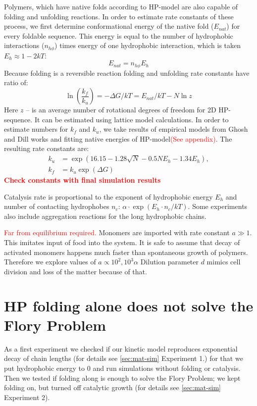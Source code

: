 \documentclass[journal=jacsat,manuscript=article,layout=twocolumn]{achemso}
\newcommand*{\ga}{\alpha}
\newcommand*{\gD}{\Delta}
\newcommand*{\pt}[1]{\left( #1\right)}
\newcommand*{\red}[1]{\textcolor{red}{#1}}
\begin{document}
Polymers, which have native folds according to HP-model are also capable of folding and unfolding 
reactions. In order to estimate rate constants of these process, we first determine conformational 
energy of the native fold ($E_{nat}$) for every foldable sequence. This energy is equal to the 
number of hydrophobic interactions ($n_{h\phi}$) times energy of one hydrophobic interaction, which 
is taken $E_h\approx 1-2kT$:
\begin{equation}
 E_{nat}=n_{h\phi}E_h
\end{equation} 
Because folding is a reversible reaction folding and unfolding rate constants have ratio 
of\cite{Ghosh2009}:
\begin{equation}
 \ln\pt{\frac{k_f}{k_u}}=-\gD G/kT = E_{nat}/kT-N\ln z
\end{equation} 
Here $z$ -- is an average number of rotational degrees of freedom for 2D HP-sequence. It can be 
estimated using lattice model calculations.
In order to estimate numbers for $k_f$ and $k_u$, we take results of empirical models from Ghosh 
and Dill works\cite{Ghosh2010,Dill2011} and fitting native energies of HP-model\red{(See 
appendix)}. The resulting rate constants are:
\begin{equation}
\begin{split}
  k_u &= \exp(16.15-1.28 \sqrt{N} -0.5 N E_h -1.34 E_{h}),\\
  k_f &= k_u\exp(\gD G)
\end{split}
\end{equation} 
\red{\textbf{Check constants with final simulation results}}

Catalysis rate is proportional to the exponent of hydrophobic energy $E_h$ and number of 
contacting hydrophobes $n_c$: $\ga\cdot\exp(E_{h}\cdot n_{c}/kT)$. Some experiments also include 
aggregation reactions for the long hydrophobic chains.

\red{Far from equilibrium required.} Monomers are imported with rate constant $a\gg1$. This 
imitates input of food into the system. It is safe to assume that decay of activated monomers 
happens much faster than spontaneous growth of polymers. Therefore we explore values of $a\propto 
10^2,10^3\ga$ Dilution parameter $d$ mimics cell division and loss of the matter because of 
that.



\section{HP folding alone does not solve the Flory Problem}
As a first experiment we checked if our kinetic model reproduces exponential decay of chain lengths 
(for details see \ref{sec:mat-sim} Experiment 1.) for that we put hydrophobic energy to 0 and run 
simulations without folding or catalysis. Then we tested if folding along is enough to solve the 
Flory Problem; we kept folding on, but turned off catalytic growth (for details see 
\ref{sec:mat-sim} Experiment 2).
\end{document}
